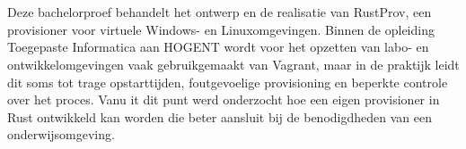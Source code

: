
%
%
%
%
%

%



\chapter*{}

Deze bachelorproef behandelt het ontwerp en de realisatie van RustProv, een provisioner voor virtuele Windows- en Linuxomgevingen. Binnen de opleiding Toegepaste Informatica aan HOGENT wordt voor het opzetten van labo- en ontwikkelomgevingen vaak gebruikgemaakt van Vagrant, maar in de praktijk leidt dit soms tot trage opstarttijden, foutgevoelige provisioning en beperkte controle over het proces. Vanu    it dit punt werd onderzocht hoe een eigen provisioner in Rust ontwikkeld kan worden die beter aansluit bij de benodigdheden van een onderwijsomgeving.

